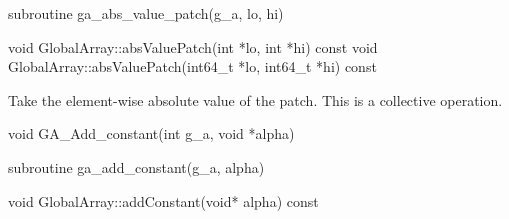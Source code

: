 \documentclass[12pt]{article}
\begin{document}
\begin{fapi}
\begin{fcode}
subroutine ga_abs_value_patch(g_a, lo, hi)
\end{fcode}
\begin{funcargs}
\end{funcargs}
\end{fapi}

\begin{cxxapi}
\begin{cxxcode}
void GlobalArray::absValuePatch(int *lo, int *hi) const
void GlobalArray::absValuePatch(int64_t *lo, int64_t *hi) const
\end{cxxcode}
\begin{funcargs}
\end{funcargs}
\end{cxxapi}

\begin{desc}

Take the element-wise absolute value of the patch.
This is a collective operation.
\end{desc}


\begin{capi}
\begin{ccode}
void GA_Add_constant(int g_a, void *alpha)
\end{ccode}
\begin{funcargs}
\end{funcargs}
\end{capi}

\begin{fapi}
\begin{fcode}
subroutine ga_add_constant(g_a,  alpha)
\end{fcode}
\begin{funcargs}
\end{funcargs}
\end{fapi}

\begin{cxxapi}
\begin{cxxcode}
void GlobalArray::addConstant(void* alpha) const
\end{cxxcode}
\begin{funcargs}
\end{funcargs}
\end{cxxapi}
\end{document}
